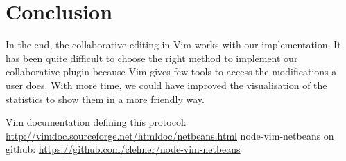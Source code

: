 \documentclass{llncs}
\begin{document}
\section{Conclusion}\label{sec:Conclusion}

In the end, the collaborative editing in Vim works with our implementation.
It has been quite difficult to choose the right method to implement our collaborative plugin
because Vim gives few tools to access the modifications a user does. With more time,
we could have improved the visualisation of the statistics to show them in a more friendly way.

\begin{thebibliography}{1}

Vim documentation defining this protocol: \url{http://vimdoc.sourceforge.net/htmldoc/netbeans.html}
node-vim-netbeans on github: \url{https://github.com/clehner/node-vim-netbeans}

\end{thebibliography}
\end{document}
